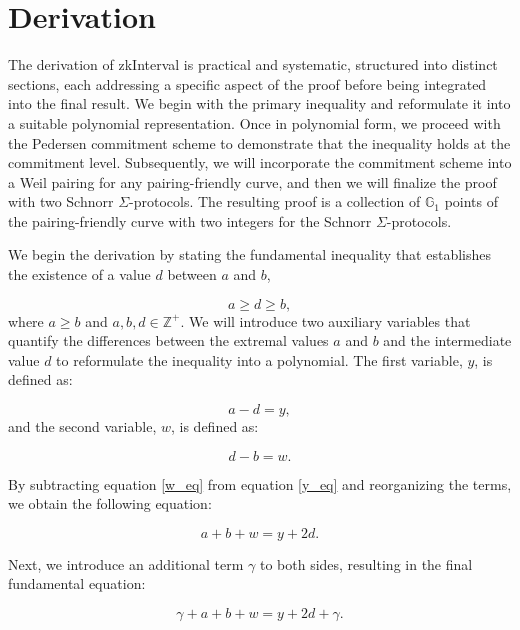 \documentclass[version=preprint]{iacrcc}
\begin{document}
\section{Derivation}

The derivation of zkInterval is practical and systematic, structured into distinct sections, each addressing a specific aspect of the proof before being integrated into the final result. We begin with the primary inequality and reformulate it into a suitable polynomial representation. Once in polynomial form, we proceed with the Pedersen commitment scheme to demonstrate that the inequality holds at the commitment level. Subsequently, we will incorporate the commitment scheme into a Weil pairing for any pairing-friendly curve, and then we will finalize the proof with two Schnorr $\Sigma$-protocols. The resulting proof is a collection of \(\mathbb{G}_{1}\) points of the pairing-friendly curve with two integers for the Schnorr $\Sigma$-protocols.

We begin the derivation by stating the fundamental inequality that establishes the existence of a value $d$ between $a$ and $b$,

\begin{equation}
a \geq d \geq b,
\end{equation}
where \( a \geq b \) and \( a, b, d \in \mathbb{Z}^+ \). We will introduce two auxiliary variables that quantify the differences between the extremal values \(a\) and \(b\) and the intermediate value \(d\) to reformulate the inequality into a polynomial. The first variable, \( y \), is defined as:

\begin{equation}
\label{y_eq}
a - d = y,
\end{equation}
and the second variable, \( w \), is defined as:

\begin{equation}
\label{w_eq}
d - b = w.
\end{equation}

By subtracting equation \ref{w_eq} from equation \ref{y_eq} and reorganizing the terms, we obtain the following equation:

\begin{equation}
\label{half_eq}
a + b + w = y + 2d.
\end{equation}

Next, we introduce an additional term \( \gamma \) to both sides, resulting in the final fundamental equation:

\begin{equation}
\label{full_eq}
\gamma + a + b + w = y + 2d + \gamma.
\end{equation}
\end{document}
